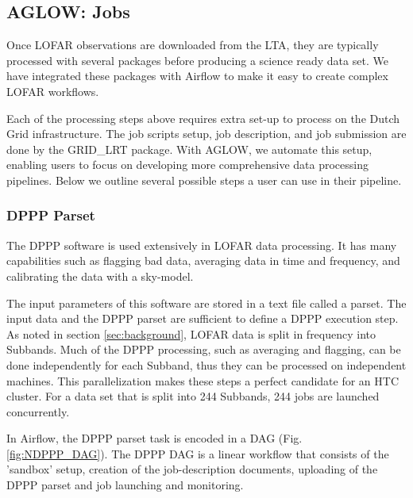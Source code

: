 \subsection{AGLOW: Jobs}

Once LOFAR observations are downloaded from the LTA, they are typically processed with several packages before producing a science ready data set. We have integrated these packages with Airflow to make it easy to create complex LOFAR workflows. 

Each of the processing steps above requires extra set-up to process on the Dutch Grid infrastructure. The job scripts setup, job description, and job submission are done by the GRID\_LRT package\cite{mechev17}. With AGLOW, we automate this setup, enabling users to focus on developing more comprehensive data processing pipelines. Below we outline several possible steps a user can use in their pipeline. 

\subsubsection{DPPP Parset}
The DPPP software is used extensively in LOFAR data processing. It has many capabilities such as flagging bad data, averaging data in time and frequency, and calibrating the data with a sky-model. 

The input parameters of this software are stored in a text file called a parset. The input data and the DPPP parset are sufficient to define a DPPP execution step. As noted in section \ref{sec:background}, LOFAR data is split in frequency into Subbands. Much of the DPPP processing, such as averaging and flagging, can be done independently for each Subband, thus they can be processed on independent machines. This parallelization makes these steps a perfect candidate for an HTC cluster. For a data set that is split into 244 Subbands, 244 jobs are launched concurrently. 

In Airflow, the DPPP parset task is encoded in a DAG (Fig. \ref{fig:NDPPP_DAG}). The DPPP DAG is a linear workflow that consists of the 'sandbox' setup, creation of the job-description documents, uploading of the DPPP parset and job launching and monitoring.


